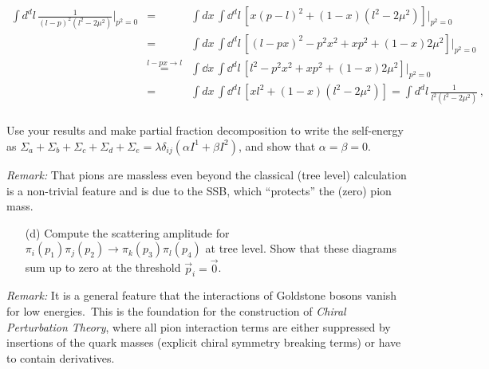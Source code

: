 \documentclass[11pt]{latex/exercise}
\begin{document}
\begin{itemize}
          \begin{eqnarray}
              \int d^d l\,\frac{1}{(l-p)^2\left(l^2-2\mu^2\right)}|_{p^2=0}
              \!\!\!&=&\!\!\!
              \int d x\, \int \dd^d l\, \left[x(p-l)^2+(1-x)(l^2-2\mu^2)\right]|_{p^2=0}
              \nonumber
              \\
              \!\!\!&=&\!\!\!
              \int d x\, \int \dd^d l\, \left[(l-px)^2-p^2x^2+xp^2+(1-x)2\mu^2\right]\big\vert_{p^2=0}
              \nonumber
              \\
              \!\!\!&\overset{l-px\rightarrow l}{=}&\!\!\!
              \int \dd x\, \int \dd^d l\, \left[l^2-p^2x^2+xp^2+(1-x)2\mu^2\right]|_{p^2=0}
              \nonumber
              \\
              \!\!\!&=&\!\!\!
              \int d x\, \int \dd^d l\, \left[xl^2+(1-x)(l^2-2\mu^2)\right]=\int d^d l\,\frac{1}{l^2\left(l^2-2\mu^2\right)}
              \,,
              \nonumber
              \\
          \end{eqnarray}

          Use your results and make partial fraction decomposition to write the self-energy as $\Sigma_{a}+\Sigma_{b}+\Sigma_{c}+\Sigma_{d}+\Sigma_{e} = \lambda \delta_{i j} \left(  \alpha I^1 + \beta I^2 \right)$, and show that $\alpha = \beta = 0$.
\end{itemize}
\emph{Remark:} That pions are massless even beyond the classical (tree level) calculation is a non-trivial feature and is due to the SSB, which ``protects'' the (zero) pion mass.

\begin{itemize}
    \item[(d)] Compute the scattering amplitude for
          $\pi_i(p_1) \pi_j(p_2) \rightarrow \pi_k(p_3) \pi_l(p_4)$
          at tree level.
          Show that these diagrams sum up to zero at the threshold $\vec{p}_i=\vec{0}$.
\end{itemize}
\emph{Remark:} It is a general feature that the interactions of Goldstone bosons vanish for low energies.~This is the foundation for the construction of \emph{Chiral Perturbation Theory}, where all pion interaction terms are either suppressed by insertions of the quark masses (explicit chiral symmetry breaking terms) or have to contain derivatives.
\end{document}
